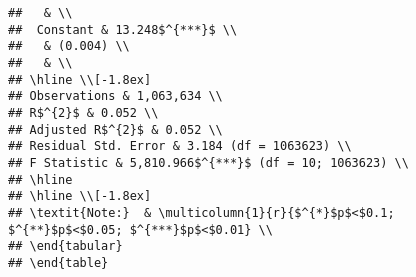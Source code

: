 \documentclass[
  12pt,
  landscape]{article}
\begin{document}
\begin{verbatim}
##   & \\ 
##  Constant & 13.248$^{***}$ \\ 
##   & (0.004) \\ 
##   & \\ 
## \hline \\[-1.8ex] 
## Observations & 1,063,634 \\ 
## R$^{2}$ & 0.052 \\ 
## Adjusted R$^{2}$ & 0.052 \\ 
## Residual Std. Error & 3.184 (df = 1063623) \\ 
## F Statistic & 5,810.966$^{***}$ (df = 10; 1063623) \\ 
## \hline 
## \hline \\[-1.8ex] 
## \textit{Note:}  & \multicolumn{1}{r}{$^{*}$p$<$0.1; $^{**}$p$<$0.05; $^{***}$p$<$0.01} \\ 
## \end{tabular} 
## \end{table}
\end{verbatim}
\end{document}
